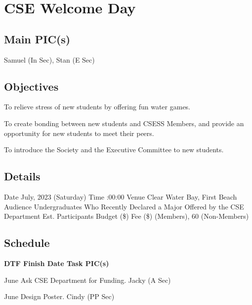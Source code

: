 \section{CSE Welcome Day}

\subsection{Main PIC(s)}
Samuel (In Sec), Stan (E Sec)

\subsection{Objectives}
\startitemize
\item To relieve stress of new students by offering fun water games.
\item To create bonding between new students and CSESS Members, and provide an opportunity for new students to meet their peers.
\item To introduce the Society and the Executive Committee to new students.
\stopitemize

\subsection{Details}
\starttabulate[|rB|l|]
\NC Date
 July, 2023 (Saturday) \NR
\NC Time
:00:00 \NR
\NC Venue
\NC Clear Water Bay, First Beach \NR
\NC Audience
\NC Undergraduates Who Recently Declared a Major Offered by the CSE Department \NR
\NC Est. Participants
 \NR
\NC Budget (\$)
 \NR
\NC Fee (\$)
 (Members), 60 (Non-Members) \NR
\stoptabulate

\subsection{Schedule}

\setupTABLE[c][1][width=0.75in]
\setupTABLE[c][2][width=1in]
\setupTABLE[c][3][width=3in]
\setupTABLE[c][4][width=1.25in]
\bTABLE
\bTABLEhead

\bTR\bTH    \bf{DTF}
\eTH\bTH    \bf{Finish Date}
\eTH\bTH    \bf{Task}
\eTH\bTH    \bf{PIC(s)}
\eTH\eTR

\eTABLEhead
\bTABLEbody

\bTR{}
\eTD{} June
\eTD\bTD Ask CSE Department for Funding.
\eTD\bTD Jacky (A Sec)
\eTD\eTR

\bTR{}
\eTD{} June
\eTD\bTD Design Poster.
\eTD\bTD Cindy (PP Sec)
\eTD\eTR

